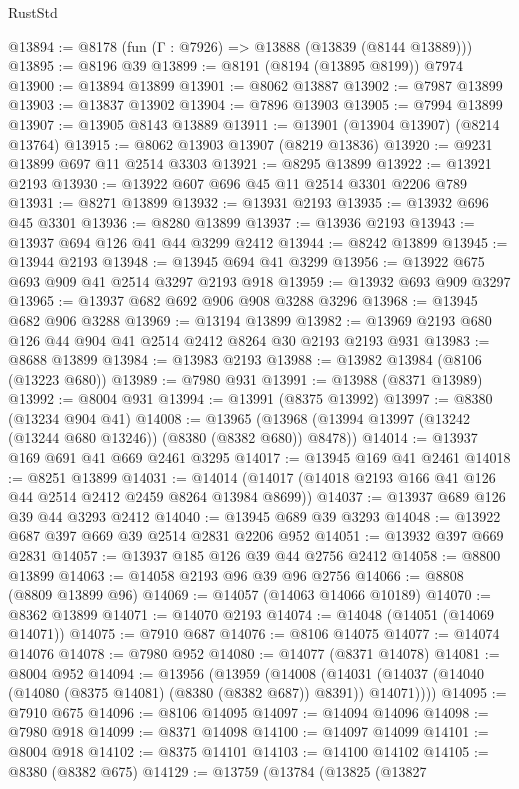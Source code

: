 \begin{lexlean}{RustStd}
\begin{coremodule}
@13894 := @8178 (fun (Γ : @7926) => @13888 (@13839 (@8144 @13889)))
@13895 := @8196 @39
@13899 := @8191 (@8194 (@13895 @8199)) @7974
@13900 := @13894 @13899
@13901 := @8062 @13887
@13902 := @7987 @13899
@13903 := @13837 @13902
@13904 := @7896 @13903
@13905 := @7994 @13899
@13907 := @13905 @8143 @13889
@13911 := @13901 (@13904 @13907) (@8214 @13764)
@13915 := @8062 @13903 @13907 (@8219 @13836)
@13920 := @9231 @13899 @697 @11 @2514 @3303
@13921 := @8295 @13899
@13922 := @13921 @2193
@13930 := @13922 @607 @696 @45 @11 @2514 @3301 @2206 @789
@13931 := @8271 @13899
@13932 := @13931 @2193
@13935 := @13932 @696 @45 @3301
@13936 := @8280 @13899
@13937 := @13936 @2193
@13943 := @13937 @694 @126 @41 @44 @3299 @2412
@13944 := @8242 @13899
@13945 := @13944 @2193
@13948 := @13945 @694 @41 @3299
@13956 := @13922 @675 @693 @909 @41 @2514 @3297 @2193 @918
@13959 := @13932 @693 @909 @3297
@13965 := @13937 @682 @692 @906 @908 @3288 @3296
@13968 := @13945 @682 @906 @3288
@13969 := @13194 @13899
@13982 := @13969 @2193 @680 @126 @44 @904 @41 @2514 @2412 @8264 @30 @2193 @2193 @931
@13983 := @8688 @13899
@13984 := @13983 @2193
@13988 := @13982 @13984 (@8106 (@13223 @680))
@13989 := @7980 @931
@13991 := @13988 (@8371 @13989)
@13992 := @8004 @931
@13994 := @13991 (@8375 @13992)
@13997 := @8380 (@13234 @904 @41)
@14008 := @13965 (@13968 (@13994 @13997 (@13242 (@13244 @680 @13246)) (@8380 (@8382 @680)) @8478))
@14014 := @13937 @169 @691 @41 @669 @2461 @3295
@14017 := @13945 @169 @41 @2461
@14018 := @8251 @13899
@14031 := @14014 (@14017 (@14018 @2193 @166 @41 @126 @44 @2514 @2412 @2459 @8264 @13984 @8699))
@14037 := @13937 @689 @126 @39 @44 @3293 @2412
@14040 := @13945 @689 @39 @3293
@14048 := @13922 @687 @397 @669 @39 @2514 @2831 @2206 @952
@14051 := @13932 @397 @669 @2831
@14057 := @13937 @185 @126 @39 @44 @2756 @2412
@14058 := @8800 @13899
@14063 := @14058 @2193 @96 @39 @96 @2756
@14066 := @8808 (@8809 @13899 @96)
@14069 := @14057 (@14063 @14066 @10189)
@14070 := @8362 @13899
@14071 := @14070 @2193
@14074 := @14048 (@14051 (@14069 @14071))
@14075 := @7910 @687
@14076 := @8106 @14075
@14077 := @14074 @14076
@14078 := @7980 @952
@14080 := @14077 (@8371 @14078)
@14081 := @8004 @952
@14094 := @13956
    (@13959
      (@14008 (@14031 (@14037 (@14040 (@14080 (@8375 @14081) (@8380 (@8382 @687)) @8391)) @14071))))
@14095 := @7910 @675
@14096 := @8106 @14095
@14097 := @14094 @14096
@14098 := @7980 @918
@14099 := @8371 @14098
@14100 := @14097 @14099
@14101 := @8004 @918
@14102 := @8375 @14101
@14103 := @14100 @14102
@14105 := @8380 (@8382 @675)
@14129 := @13759
    (@13784
      (@13825
        (@13827

\end{coremodule}
\end{lexlean}
